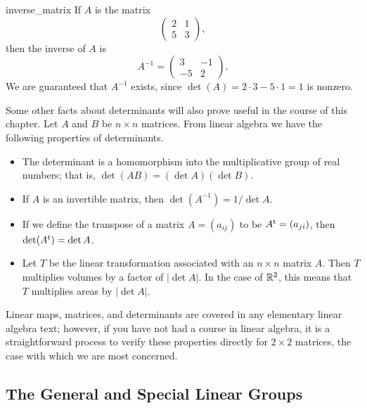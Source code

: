  
\begin{example}{inverse_matrix}
If $A$ is the matrix
\[
\begin{pmatrix}
2 & 1 \\
5 & 3
\end{pmatrix},
\]
then the inverse of $A$ is
\[
A^{-1} =
\begin{pmatrix}
3 & -1 \\
-5 & 2
\end{pmatrix}.
\]
We are guaranteed  that $A^{-1}$ exists, since $\det(A) = 2 \cdot 3 - 5
\cdot 1 = 1$ is nonzero. \mbox{\hspace*{1in}}
\end{example}
 
 
Some other facts about determinants will also prove useful in the
course of this chapter.   Let $A$ and $B$ be $n \times n$ matrices.
From linear algebra we have the following properties of determinants.
\begin{itemize}
 
\item
The determinant is a homomorphism into the multiplicative group of
real numbers; that is, $\det( A B) = (\det A )(\det B)$. 
 
\item
If $A$ is an invertible matrix, then $\det(A^{-1}) = 1 / \det A$.
 
\item
If we define the transpose  of a matrix $A = (a_{ij})$ to be $A^{\rm
t} = (a_{ji})$, then $\det(A^{\rm t}) = \det A$. 
 
\item
Let $T$ be the linear transformation associated with an $n \times n$
matrix $A$. Then $T$ multiplies volumes by a factor of $|\det A|$. In
the case of ${\Bbb R}^2$, this means that $T$ multiplies areas by
$|\det A|$.
 
\end{itemize}
 
 
Linear maps, matrices, and determinants are covered in any elementary
linear algebra text; however, if you have not had a course in linear
algebra, it is a straightforward process to verify these properties
directly for $2 \times 2$ matrices, the case with which we are most
concerned. 
 
 
 
\subsection*{The General and Special Linear Groups}
 
